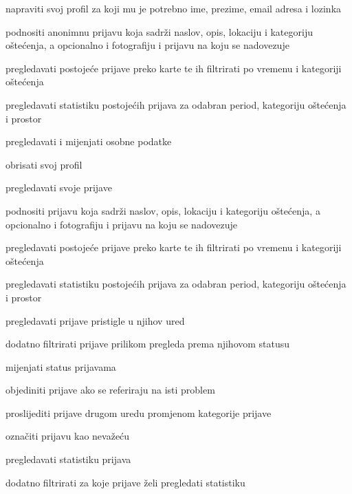 			\begin{packed_enum}
				
				\item  {}
				\begin{packed_enum}
					\item napraviti svoj profil za koji mu je potrebno ime, prezime, email adresa i lozinka
					\item podnositi anonimnu prijavu koja sadrži naslov, opis, lokaciju i kategoriju oštećenja, a opcionalno i fotografiju i prijavu na koju se nadovezuje
					\item pregledavati postojeće prijave preko karte te ih filtrirati po vremenu i kategoriji oštećenja
					\item pregledavati statistiku postojećih prijava za odabran period, kategoriju oštećenja i prostor			
				\end{packed_enum}
								
				\item  {}				
				\begin{packed_enum}					
					\item pregledavati i mijenjati osobne podatke
					\item obrisati svoj profil
					\item pregledavati svoje prijave
					\item podnositi prijavu koja sadrži naslov, opis, lokaciju i kategoriju oštećenja, a opcionalno i fotografiju i prijavu na koju se nadovezuje
					\item  pregledavati postojeće prijave preko karte te ih filtrirati po vremenu i kategoriji oštećenja
					\item pregledavati statistiku postojećih prijava za odabran period, kategoriju oštećenja i prostor
				\end{packed_enum}
				
				\item  {}
				\begin{packed_enum}
					\item pregledavati prijave pristigle u njihov ured
					\item dodatno filtrirati prijave prilikom pregleda prema njihovom statusu
					\item mijenjati status prijavama
					\item objediniti prijave ako se referiraju na isti problem
					\item proslijediti prijave drugom uredu promjenom kategorije prijave
					\item označiti prijavu kao nevažeću
					\item pregledavati statistiku prijava
					\item dodatno filtrirati za koje prijave želi pregledati statistiku
				\end{packed_enum}
				

\end{packed_enum}
